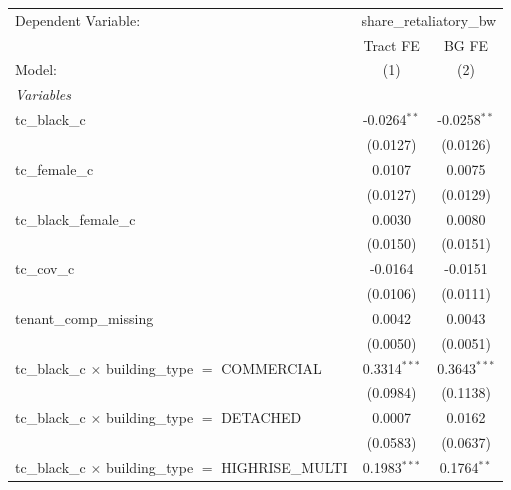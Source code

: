 \begin{tabular}{lcc}
   \tabularnewline \midrule \midrule
   Dependent Variable: & \multicolumn{2}{c}{share\_retaliatory\_bw}\\
                                                                       & Tract FE       & BG FE \\   
   Model:                                                              & (1)            & (2)\\  
   \midrule
   \emph{Variables}\\
   tc\_black\_c                                                        & -0.0264$^{**}$ & -0.0258$^{**}$\\   
                                                                       & (0.0127)       & (0.0126)\\   
   tc\_female\_c                                                       & 0.0107         & 0.0075\\   
                                                                       & (0.0127)       & (0.0129)\\   
   tc\_black\_female\_c                                                & 0.0030         & 0.0080\\   
                                                                       & (0.0150)       & (0.0151)\\   
   tc\_cov\_c                                                          & -0.0164        & -0.0151\\   
                                                                       & (0.0106)       & (0.0111)\\   
   tenant\_comp\_missing                                               & 0.0042         & 0.0043\\   
                                                                       & (0.0050)       & (0.0051)\\   
   tc\_black\_c $\times$ building\_type $=$ COMMERCIAL                 & 0.3314$^{***}$ & 0.3643$^{***}$\\   
                                                                       & (0.0984)       & (0.1138)\\   
   tc\_black\_c $\times$ building\_type $=$ DETACHED                   & 0.0007         & 0.0162\\   
                                                                       & (0.0583)       & (0.0637)\\   
   tc\_black\_c $\times$ building\_type $=$ HIGHRISE\_MULTI            & 0.1983$^{***}$ & 0.1764$^{**}$\\   

\end{tabular}
